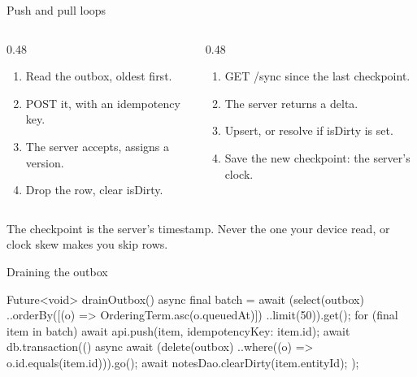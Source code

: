 \documentclass[10pt,aspectratio=169,t]{beamer}
\begin{document}
\begin{frame}[eyebrow=Sync engine]{Push and pull loops}
  \vskip 2mm
  \begin{columns}[T]
    \begin{column}{0.48\textwidth}
      \begin{enumerate}
        \item Read the outbox, oldest first.
        \item POST it, with an idempotency key.
        \item The server accepts, assigns a version.
        \item Drop the row, clear isDirty.
      \end{enumerate}
    \end{column}
    \begin{column}{0.48\textwidth}
      \begin{enumerate}
        \item GET /sync since the last checkpoint.
        \item The server returns a delta.
        \item Upsert, or resolve if isDirty is set.
        \item Save the new checkpoint: the server's clock.
      \end{enumerate}
    \end{column}
  \end{columns}
  \begin{takeaway}{The checkpoint is the server's timestamp.}
    Never the one your device read, or clock skew makes you skip rows.
  \end{takeaway}
\end{frame}

\begin{frame}[fragile,eyebrow=Sync engine]{Draining the outbox}
  \vskip 1mm
\begin{dart}
Future<void> drainOutbox() async {
  final batch = await (select(outbox)
        ..orderBy([(o) => OrderingTerm.asc(o.queuedAt)])
        ..limit(50)).get();
  for (final item in batch) {
    await api.push(item, idempotencyKey: item.id);
    await db.transaction(() async {
      await (delete(outbox)
          ..where((o) => o.id.equals(item.id))).go();
      await notesDao.clearDirty(item.entityId);
    });
  }
}
\end{dart}
\end{frame}
\end{document}
